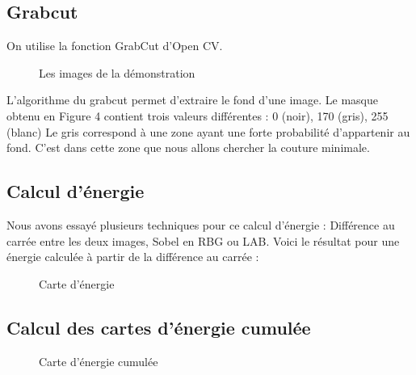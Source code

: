 \documentclass[a4paper]{article}
\begin{document}
\subsection{Grabcut}      
On utilise la fonction GrabCut d'Open CV.
\begin{figure}[!ht]%
    \centering
    \hspace{0.030\textwidth}
    \caption{Les images de la démonstration}
    \label{gc}
\end{figure}

L'algorithme du grabcut permet d'extraire le fond d'une image. 
Le masque obtenu en Figure 4 contient trois valeurs différentes : 0 (noir), 170 (gris), 255 (blanc) Le gris correspond à une zone ayant une forte probabilité d'appartenir au fond. C'est dans cette zone que nous allons chercher la couture minimale.

\subsection{Calcul d'énergie}

Nous avons essayé plusieurs techniques pour ce calcul d'énergie : Différence au carrée entre les deux images, Sobel en RBG ou LAB.
Voici le résultat pour une énergie calculée à partir de la différence au carrée :
\begin{figure}[!ht]%
    \centering
    \hspace{0.030\textwidth}
    \caption{Carte d'énergie}
    \label{energie}
\end{figure}

\subsection{Calcul des cartes d'énergie cumulée}
\begin{figure}[!ht]%
    \centering
    \hspace{0.030\textwidth}
    \caption{Carte d'énergie cumulée}
    \label{ecum}
\end{figure}
\end{document}
